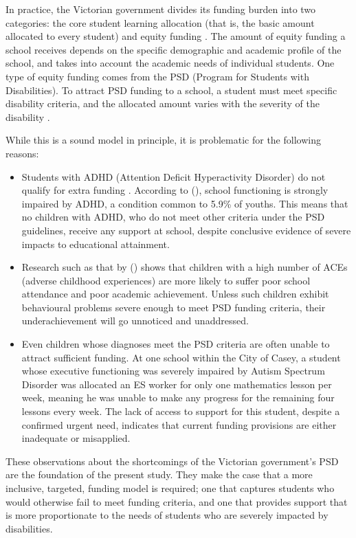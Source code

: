 \documentclass[11pt, a4paper]{article}
\begin{document}
    In practice, the Victorian government divides its funding burden into two categories: the core student learning allocation (that is, the basic amount allocated to every student) and equity funding \parencite{srp_vic}. The amount of equity funding a school receives depends on the specific demographic and academic profile of the school, and takes into account the academic needs of individual students. One type of equity funding comes from the PSD (Program for Students with Disabilities). To attract PSD funding to a school, a student must meet specific disability criteria, and the allocated amount varies with the severity of the disability \parencite{psd_guidelines}.

    While this is a sound model in principle, it is problematic for the following reasons:

    \begin{itemize}
        \item Students with ADHD (Attention Deficit Hyperactivity Disorder) do not qualify for extra funding \parencite{psd_guidelines}. According to  (), school functioning is strongly impaired by ADHD, a condition common to 5.9\% of youths. This means that no children with ADHD, who do not meet other criteria under the PSD guidelines, receive any support at school, despite conclusive evidence of severe impacts to educational attainment.
        \item Research such as that by  () shows that children with a high number of ACEs (adverse childhood experiences) are more likely to suffer poor school attendance and poor academic achievement. Unless such children exhibit behavioural problems severe enough to meet PSD funding criteria, their underachievement will go unnoticed and unaddressed.
        \item Even children whose diagnoses meet the PSD criteria are often unable to attract sufficient funding. At one school within the City of Casey, a student whose executive functioning was severely impaired by Autism Spectrum Disorder was allocated an ES worker for only one mathematics lesson per week, meaning he was unable to make any progress for the remaining four lessons every week. The lack of access to support for this student, despite a confirmed urgent need, indicates that current funding provisions are either inadequate or misapplied.
    \end{itemize}

    These observations about the shortcomings of the Victorian government's PSD are the foundation of the present study. They make the case that a more inclusive, targeted, funding model is required; one that captures students who would otherwise fail to meet funding criteria, and one that provides support that is more proportionate to the needs of students who are severely impacted by disabilities.
\end{document}
